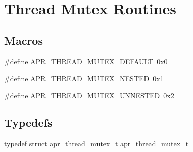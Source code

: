 \hypertarget{group__apr__thread__mutex}{\section{Thread Mutex Routines}
\label{group__apr__thread__mutex}
}
\subsection*{Macros}
\begin{DoxyCompactItemize}
\item 
\#define \hyperlink{group__apr__thread__mutex_ga579050872f9aff06e773b084264f7d06}{A\-P\-R\-\_\-\-T\-H\-R\-E\-A\-D\-\_\-\-M\-U\-T\-E\-X\-\_\-\-D\-E\-F\-A\-U\-L\-T}~0x0
\item 
\#define \hyperlink{group__apr__thread__mutex_gaf421e0445dbc3c739130f5f6544c2e78}{A\-P\-R\-\_\-\-T\-H\-R\-E\-A\-D\-\_\-\-M\-U\-T\-E\-X\-\_\-\-N\-E\-S\-T\-E\-D}~0x1
\item 
\#define \hyperlink{group__apr__thread__mutex_gac31107f3db115edc0c26ea48943c6a16}{A\-P\-R\-\_\-\-T\-H\-R\-E\-A\-D\-\_\-\-M\-U\-T\-E\-X\-\_\-\-U\-N\-N\-E\-S\-T\-E\-D}~0x2
\end{DoxyCompactItemize}
\subsection*{Typedefs}
\begin{DoxyCompactItemize}
\item 
typedef struct \hyperlink{group__apr__thread__mutex_ga95712060ba3a192036416e1ccef1db75}{apr\-\_\-thread\-\_\-mutex\-\_\-t} \hyperlink{group__apr__thread__mutex_ga95712060ba3a192036416e1ccef1db75}{apr\-\_\-thread\-\_\-mutex\-\_\-t}
\end{DoxyCompactItemize}
